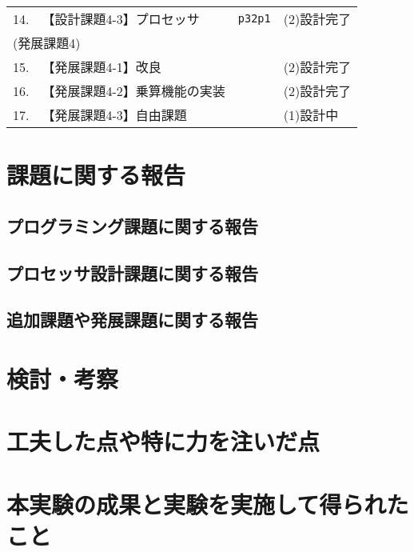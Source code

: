 \documentclass[autodetect-engine,dvi=dvipdfmx,ja=standard,
               a4j,11pt]{bxjsarticle}
\begin{document}
\begin{table}[b]
\begin{center}
{\begin{tabular}{rll|l}
    14. & 【設計課題4-3】プロセッサ      & \verb|p32p1|          & (2)設計完了 \\
    \multicolumn{3}{l|}{(発展課題4)} & \\
    15. & 【発展課題4-1】改良            &                       & (2)設計完了 \\
    16. & 【発展課題4-2】乗算機能の実装  &                       & (2)設計完了 \\
    17. & 【発展課題4-3】自由課題        &                       & (1)設計中 \\
    \hline
    \end{tabular}
    }
    \end{center}
    \end{table}
    \clearpage
\section{課題に関する報告}
\subsection{プログラミング課題に関する報告}
\subsection{プロセッサ設計課題に関する報告}
\subsection{追加課題や発展課題に関する報告}
\section{検討・考察}
\section{工夫した点や特に力を注いだ点}
\section{本実験の成果と実験を実施して得られたこと}
\end{document}
